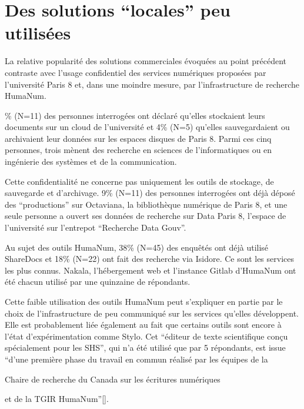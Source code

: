 \documentclass[letterpaper,10pt,english]{jupyterBook}
\begin{document}
\section{Des solutions “locales” peu utilisées}
\label{\detokenize{script_analyse/synthese/main_results:des-solutions-locales-peu-utilisees}}
\sphinxAtStartPar
La relative popularité des solutions commerciales évoquées au point précédent contraste avec l’usage confidentiel des services numériques proposées par l’université Paris 8 et, dans une moindre mesure, par l’infrastructure de recherche Huma\sphinxhyphen{}Num.

\% (N=11) des personnes interrogées ont déclaré qu’elles stockaient leurs documents sur un cloud de l’université et 4\% (N=5) qu’elles sauvegardaient ou archivaient leur données sur les espaces disques de Paris 8. Parmi ces cinq personnes, trois mènent des recherche en sciences de l’informatiques ou en ingénierie des systèmes et de la communication.

\sphinxAtStartPar
Cette confidentialité ne concerne pas uniquement les outils de stockage, de sauvegarde et d’archivage. 9\% (N=11) des personnes interrogées ont déjà déposé des “productions” sur Octaviana, la bibliothèque numérique de Paris 8, et une seule personne a ouvert ses données de recherche sur Data Paris 8, l’espace de l’université sur l’entrepot “Recherche Data Gouv”.

\sphinxAtStartPar
Au sujet des outils Huma\sphinxhyphen{}Num, 38\% (N=45) des enquêtés ont déjà utilisé ShareDocs et 18\% (N=22) ont fait des recherche via Isidore. Ce sont les services les plus connus. Nakala, l’hébergement web et l’instance Gitlab d’Huma\sphinxhyphen{}Num ont été chacun utilisé par une quinzaine de répondants.

\sphinxAtStartPar
Cette faible utilisation des outils Huma\sphinxhyphen{}Num peut s’expliquer en partie par le choix de l’infrastructure de peu communiqué sur les services qu’elles développent. Elle est probablement liée également au fait que certains outils sont encore à l’état d’expérimentation comme Stylo. Cet “éditeur de texte scientifique conçu spécialement pour les SHS”, qui n’a été utilisé que par 5 répondants, est issue “d’une première phase du travail en commun réalisé par les équipes de la {\hyperref[\detokenize{glossaire:term-CRC-EN}]{}}%
\begin{footnote}[4]\sphinxAtStartFootnote
Chaire de recherche du Canada sur les écritures numériques
%
\end{footnote} et de la TGIR Huma\sphinxhyphen{}Num”{[}{]}.
\end{document}
